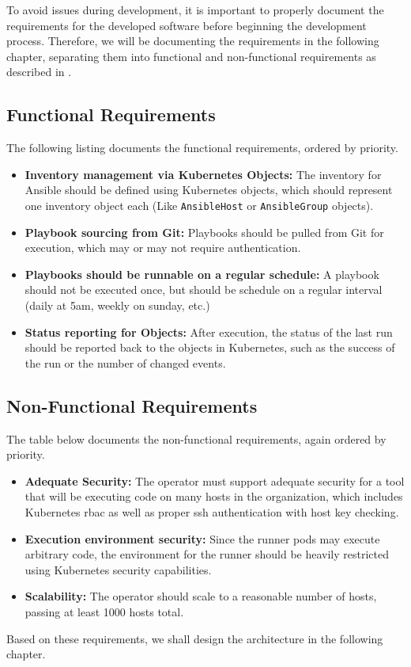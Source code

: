 To avoid issues during development, it is important to properly document the requirements for the developed software before beginning the development process. Therefore, we will be documenting the requirements in the following chapter, separating them into functional and non-functional requirements as described in \cite{braunNichtfunktionaleAnforderungen2016}.

\subsection{Functional Requirements}
The following listing documents the functional requirements, ordered by priority.

\begin{itemize}
	\item \textbf{Inventory management via Kubernetes Objects:} The inventory for Ansible should be defined using Kubernetes objects, which should represent one inventory object each (Like \texttt{AnsibleHost} or \texttt{AnsibleGroup} objects).
	\item \textbf{Playbook sourcing from Git:} Playbooks should be pulled from Git for execution, which may or may not require authentication.
	\item \textbf{Playbooks should be runnable on a regular schedule:} A playbook should not be executed once, but should be schedule on a regular interval (daily at 5am, weekly on sunday, etc.)
	\item \textbf{Status reporting for Objects:} After execution, the status of the last run should be reported back to the objects in Kubernetes, such as the success of the run or the number of changed events.
\end{itemize}

\subsection{Non-Functional Requirements}
The table below documents the non-functional requirements, again ordered by priority.

\begin{itemize}
	\item \textbf{Adequate Security:} The operator must support adequate security for a tool that will be executing code on many hosts in the organization, which includes Kubernetes \gls{rbac} as well as proper \gls{ssh} authentication with host key checking.
    \item \textbf{Execution environment security:} Since the runner pods may execute arbitrary code, the environment for the runner should be heavily restricted using Kubernetes security capabilities.
    \item \textbf{Scalability:} The operator should scale to a reasonable number of hosts, passing at least 1000 hosts total.
\end{itemize}

Based on these requirements, we shall design the architecture in the following chapter.
